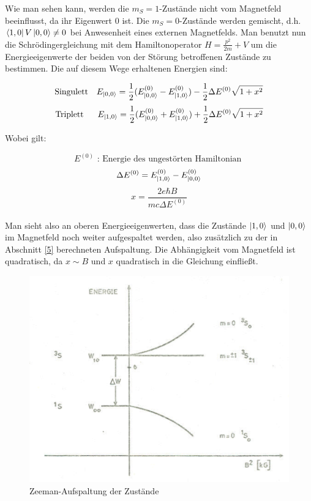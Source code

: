 Wie man sehen kann, werden die $m_S = 1$-Zustände nicht vom Magnetfeld beeinflusst, da ihr Eigenwert 0 ist. Die $m_S = 0$-Zustände werden gemischt, d.h. $\bra{1,0}V\ket{0,0}\neq 0$ bei Anwesenheit eines externen Magnetfelds. Man benutzt nun die Schrödingergleichung mit dem Hamiltonoperator $H=\frac{p^2}{2m}+V$ um die Energieeigenwerte der beiden von der Störung betroffenen Zustände zu bestimmen. Die auf diesem Wege erhaltenen Energien sind:

\begin{equation} \text{Singulett\ \ \ } E_{\ket{0,0}} = \frac{1}{2}(E_{\ket{0,0}}^{(0)} - E_{\ket{1,0}}^{(0)}) - \frac{1}{2}\Delta E^{(0)}\sqrt{1+x^2} \end{equation}
\begin{equation} \text{Triplett\ \ \ \ \ } E_{\ket{1,0}} = \frac{1}{2}(E_{\ket{0,0}}^{(0)} + E_{\ket{1,0}}^{(0)}) + \frac{1}{2}\Delta E^{(0)}\sqrt{1+x^2} \end{equation}

Wobei gilt:

$$ E^{(0)} \text{ : Energie des ungestörten Hamiltonian \ } $$
$$ \Delta E^{(0)} = E_{\ket{1,0}}^{(0)} - E_{\ket{0,0}}^{(0)} $$
\begin{equation} x = \frac{2e\hbar B}{mc\Delta E^{(0)}} \end{equation} \\

Man sieht also an oberen Energieeigenwerten, dass die Zustände $\ket{1,0}$ und $\ket{0,0}$ im Magnetfeld noch weiter aufgespaltet werden, also zusätzlich zu der in Abschnitt \ref{5} berechneten Aufspaltung. Die Abhängigkeit vom Magnetfeld ist quadratisch, da $x\sim B$ und $x$ quadratisch in die Gleichung einfließt.

\begin{figure}[H]
\centering \includegraphics[width=\textwidth]{BilderTheorie/Zeeman.png}
\caption{Zeeman-Aufspaltung der Zustände \cite{staatsex}}
\end{figure}

